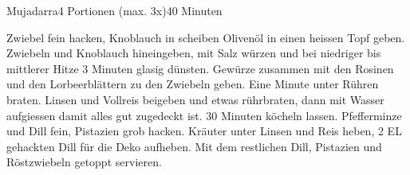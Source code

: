 \begin{recipe}{Mujadarra}{4 Portionen (max. 3x)}{40 Minuten}

Zwiebel fein hacken, Knoblauch in scheiben
Olivenöl in einen heissen Topf geben. Zwiebeln und Knoblauch hineingeben, mit Salz würzen und bei niedriger bis mittlerer Hitze 3 Minuten glasig dünsten.
Gewürze zusammen mit den Rosinen und den Lorbeerblättern zu den Zwiebeln geben. Eine Minute unter Rühren braten.
Linsen und Vollreis beigeben und etwas rührbraten, dann mit Wasser aufgiessen damit alles gut zugedeckt ist. 30 Minuten köcheln lassen.
Pfefferminze und Dill fein, Pistazien grob hacken. Kräuter unter Linsen und Reis heben, 2 EL gehackten Dill für die Deko aufheben.
Mit dem restlichen Dill, Pistazien und Röstzwiebeln getoppt servieren.

\end{recipe}
